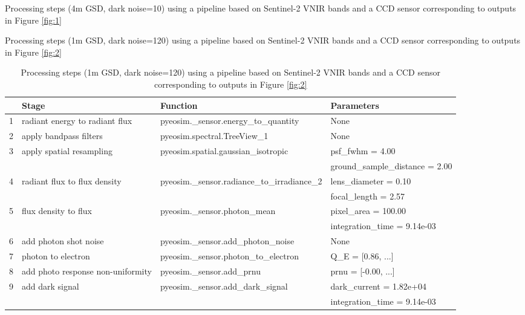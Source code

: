 \documentclass[10pt,a4paper,final,twocolumn]{article}
\begin{document}
\begin{table*}
\caption{Processing steps (4m GSD, dark noise=10) using a pipeline based on Sentinel-2 VNIR bands and a CCD sensor corresponding to outputs in Figure \ref{fig:1} }
\small

\label{tab:params1}
\end{table*}

\begin{table*}
\caption{Processing steps (1m GSD, dark noise=120) using a pipeline based on Sentinel-2 VNIR bands and a CCD sensor corresponding to outputs in Figure \ref{fig:2} }
\small

\label{tab:params2}
\end{table*}

\begin{table*}
\caption{Processing steps (1m GSD, dark noise=120) using a pipeline based on Sentinel-2 VNIR bands and a CCD sensor corresponding to outputs in Figure \ref{fig:2} }
\small
\begin{tabular}{llll}
\toprule
 & \bf{Stage} & \bf{Function} & \bf{Parameters} \\
\midrule
1 & radiant energy to radiant flux & pyeosim.\_sensor.energy\_to\_quantity & None\\
\midrule
2 & apply bandpass filters & pyeosim.spectral.TreeView\_1 & None\\
\midrule
3 & apply spatial resampling & pyeosim.spatial.gaussian\_isotropic & psf\_fwhm = 4.00\\
 & & & ground\_sample\_distance = 2.00\\
\midrule
4 & radiant flux to flux density & pyeosim.\_sensor.radiance\_to\_irradiance\_2 & lens\_diameter = 0.10\\
 & & & focal\_length = 2.57\\
\midrule
5 & flux density to flux & pyeosim.\_sensor.photon\_mean & pixel\_area = 100.00\\
 & & & integration\_time = 9.14e-03\\
\midrule
6 & add photon shot noise & pyeosim.\_sensor.add\_photon\_noise & None\\
\midrule
7 & photon to electron & pyeosim.\_sensor.photon\_to\_electron & Q\_E = [0.86, ...]\\
\midrule
8 & add photo response non-uniformity & pyeosim.\_sensor.add\_prnu & prnu = [-0.00, ...]\\
\midrule
9 & add dark signal & pyeosim.\_sensor.add\_dark\_signal & dark\_current = 1.82e+04\\
 & & & integration\_time = 9.14e-03\\

\end{tabular}
\end{table*}
\end{document}
